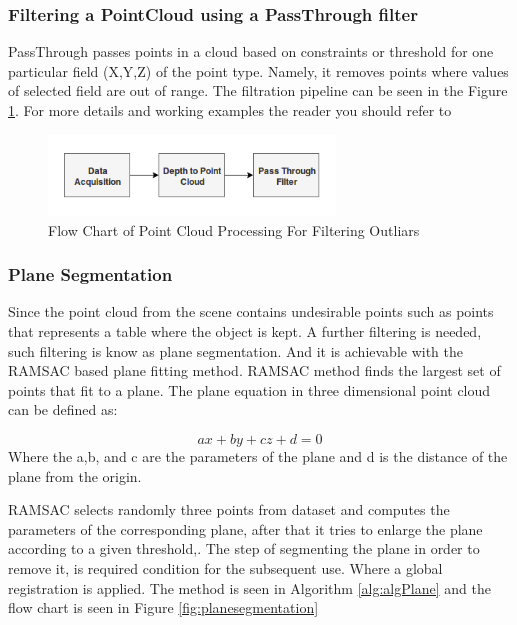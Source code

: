 \subsubsection{Filtering a PointCloud using a PassThrough filter}

PassThrough passes points in a cloud based on constraints or threshold for one particular field (X,Y,Z) of the point type. Namely, it removes points where values of selected field are out of range. The filtration pipeline can be seen in the Figure \ref{fig:passthrough}. For more details and working examples the reader you should refer to \cite{pcl}

\begin{figure}[!h]
\begin{center}
\includegraphics[width=3in]{diagrams/passthrough.png}
\caption{Flow Chart of Point Cloud Processing For Filtering Outliars}%
\label{fig:passthrough}
\end{center}
\end{figure}


\subsubsection{Plane Segmentation}

Since the point cloud from the scene contains undesirable points such as points that represents a table where the object is kept. A further filtering is needed, such filtering is know as plane segmentation. And it is achievable with the RAMSAC based plane fitting method. RAMSAC method finds the largest set of points that fit to a plane. The plane equation in three dimensional point cloud can be defined as:

\begin{equation}
    ax+by+cz+d=0
\end{equation}
Where the a,b, and c are the parameters of the plane and d is the distance of the plane from the origin.

RAMSAC selects randomly three points from dataset and computes the parameters of the corresponding plane, after that it tries to enlarge the plane according to a given threshold,\cite{algPlane}. The step of segmenting the plane in order to remove it, is required condition for the subsequent use. Where a global registration is applied.  The method is seen in Algorithm \ref{alg:algPlane} and the flow chart is seen in Figure \ref{fig:planesegmentation}  

